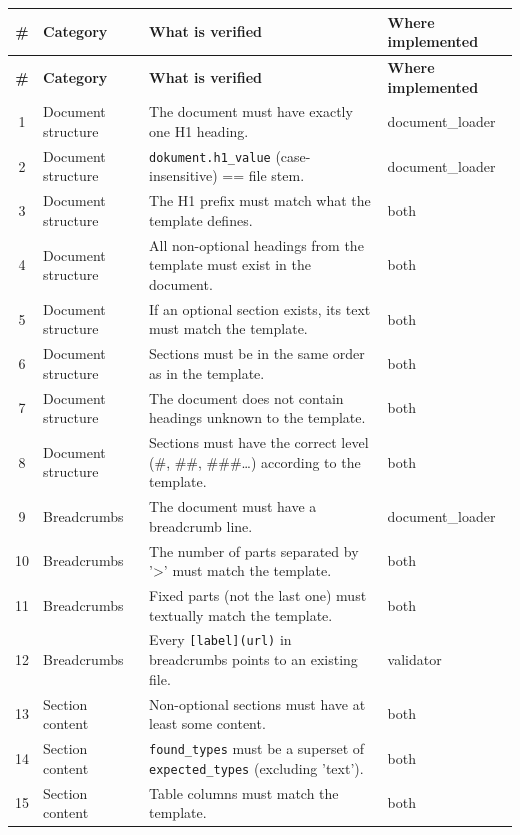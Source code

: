 \documentclass[12pt, a4paper]{article}
\begin{document}
\renewcommand{\arraystretch}{1.25}
\begin{small}
\begin{longtable}{|c|p{3.0cm}|p{8.5cm}|p{2.5cm}|}
\hline
\textbf{\#} & \textbf{Category} & \textbf{What is verified} & \textbf{Where implemented} \\
\hline
\endfirsthead
\hline
\textbf{\#} & \textbf{Category} & \textbf{What is verified} & \textbf{Where implemented} \\
\hline
\endhead

1 & Document structure & The document must have exactly one H1 heading. & document\_loader \\ \hline
2 & Document structure & \texttt{dokument.h1\_value} (case-insensitive) == file stem. & document\_loader \\ \hline
3 & Document structure & The H1 prefix must match what the template defines. & both \\ \hline
4 & Document structure & All non-optional headings from the template must exist in the document. & both \\ \hline
5 & Document structure & If an optional section exists, its text must match the template. & both \\ \hline
6 & Document structure & Sections must be in the same order as in the template. & both \\ \hline
7 & Document structure & The document does not contain headings unknown to the template. & both \\ \hline
8 & Document structure & Sections must have the correct level (\#, \#\#, \#\#\#\ldots) according to the template. & both \\ \hline
9 & Breadcrumbs & The document must have a breadcrumb line. & document\_loader \\ \hline
10 & Breadcrumbs & The number of parts separated by '>' must match the template. & both \\ \hline
11 & Breadcrumbs & Fixed parts (not the last one) must textually match the template. & both \\ \hline
12 & Breadcrumbs & Every \texttt{[label](url)} in breadcrumbs points to an existing file. & validator \\ \hline
13 & Section content & Non-optional sections must have at least some content. & both \\ \hline
14 & Section content & \texttt{found\_types} must be a superset of \texttt{expected\_types} (excluding 'text'). & both \\ \hline
15 & Section content & Table columns must match the template. & both \\ \hline

\end{longtable}
\end{small}
\end{document}
